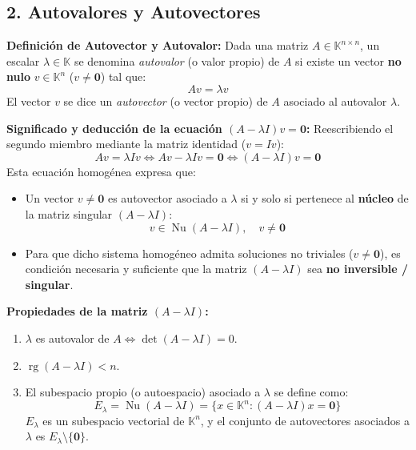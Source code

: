 \documentclass[11pt,a4paper]{article}
\begin{document}
\subsection*{2. Autovalores y Autovectores}

\textbf{Definición de Autovector y Autovalor:} Dada una matriz $A \in \mathbb{K}^{n \times n}$, un escalar $\lambda \in \mathbb{K}$ se denomina \emph{autovalor} (o valor propio) de $A$ si existe un vector \textbf{no nulo} $v \in \mathbb{K}^n$ ($v \neq \mathbf{0}$) tal que:
\[
A v = \lambda v
\]
El vector $v$ se dice un \emph{autovector} (o vector propio) de $A$ asociado al autovalor $\lambda$.

\vspace{0.5em}
\noindent
\textbf{Significado y deducción de la ecuación $(A - \lambda I)v = \mathbf{0}$:}
Reescribiendo el segundo miembro mediante la matriz identidad ($v = Iv$):
\[
A v = \lambda I v \iff A v - \lambda I v = \mathbf{0} \iff (A - \lambda I)v = \mathbf{0}
\]
Esta ecuación homogénea expresa que:
\begin{itemize}
    \item Un vector $v \neq \mathbf{0}$ es autovector asociado a $\lambda$ si y solo si pertenece al \textbf{núcleo} de la matriz singular $(A - \lambda I)$:
    \[
    v \in \operatorname{Nu}(A - \lambda I), \quad v \neq \mathbf{0}
    \]
    \item Para que dicho sistema homogéneo admita soluciones no triviales ($v \neq \mathbf{0}$), es condición necesaria y suficiente que la matriz $(A - \lambda I)$ sea \textbf{no inversible / singular}.
\end{itemize}

\vspace{0.5em}
\noindent
\textbf{Propiedades de la matriz $(A - \lambda I)$:}
\begin{enumerate}
    \item $\lambda$ es autovalor de $A \iff \det(A - \lambda I) = 0$.
    \item $\operatorname{rg}(A - \lambda I) < n$.
    \item El subespacio propio (o autoespacio) asociado a $\lambda$ se define como:
    \[
    E_\lambda = \operatorname{Nu}(A - \lambda I) = \{x \in \mathbb{K}^n : (A - \lambda I)x = \mathbf{0}\}
    \]
    $E_\lambda$ es un subespacio vectorial de $\mathbb{K}^n$, y el conjunto de autovectores asociados a $\lambda$ es $E_\lambda \setminus \{\mathbf{0}\}$.
\end{enumerate}
\end{document}
